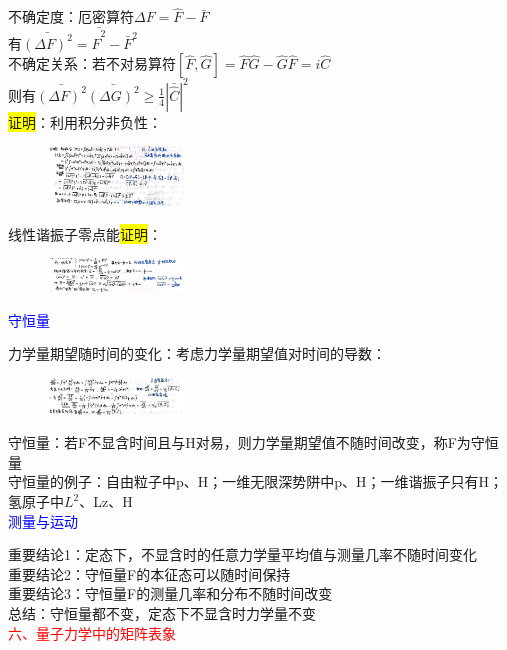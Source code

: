\documentclass[a4paper,8pt]{extarticle} %
\newcommand{\bluetext}[1]{\textcolor{blue}{#1}}
\newcommand{\redtext}[1]{\textcolor{red}{#1}}
\newcommand{\yellowback}[1]{\colorbox{yellow}{#1}}
\begin{document}
\begin{multicols}{3}
不确定度：厄密算符$\Delta F = \hat{F}-\bar{F}$\\
有$\bar{(\Delta F)^2} = \bar{\hat{F}^2} - \bar{F}^2$\\
不确定关系：若不对易算符$[\hat{F},\hat{G}] = \hat{F}\hat{G}-\hat{G}\hat{F} = i\hat{C}$\\
则有$\bar{(\Delta F)^2}\bar{(\Delta G)^2} \geq \frac{1}{4}|\bar{\hat{C}}|^2$\\
\yellowback{证明}：利用积分非负性：\\
\begin{figure}[H]
    \vspace{-0.5cm}
    \centering
    \includegraphics[width=0.32\textwidth]{images/28.png}
    \vspace{-0.6cm}
\end{figure}
线性谐振子零点能\yellowback{证明}：\\
\begin{figure}[H]
    \centering
    \includegraphics[width=0.32\textwidth]{images/3.png}
    \vspace{-0.6cm}
\end{figure}
\bluetext{守恒量}

力学量期望随时间的变化：考虑力学量期望值对时间的导数：\\
\begin{figure}[H]
    \vspace{-0.5cm}
    \centering
    \includegraphics[width=0.32\textwidth]{images/29.png}
    \vspace{-0.6cm}
\end{figure}
守恒量：若F不显含时间且与H对易，则力学量期望值不随时间改变，称F为守恒量\\
守恒量的例子：自由粒子中p、H；一维无限深势阱中p、H；一维谐振子只有H；氢原子中$L^2$、Lz、H\\
\bluetext{测量与运动}

重要结论1：定态下，不显含时的任意力学量平均值与测量几率不随时间变化\\
重要结论2：守恒量F的本征态可以随时间保持\\
重要结论3：守恒量F的测量几率和分布不随时间改变\\
总结：守恒量都不变，定态下不显含时力学量不变\\
\redtext{六、量子力学中的矩阵表象}


\end{multicols}
\end{document}

